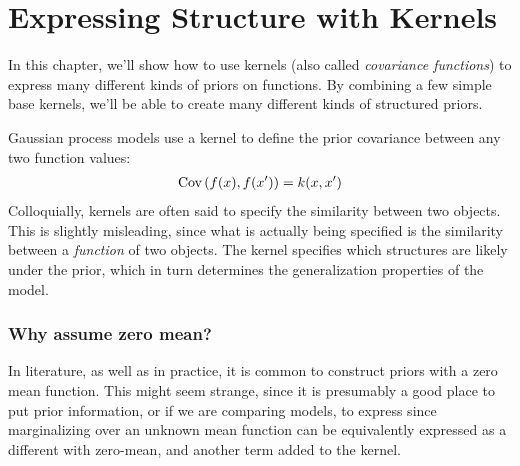 
\inbpdocument

\chapter{Expressing Structure with Kernels}
\label{ch:kernels}

In this chapter, we'll show how to use kernels (also called \emph{covariance functions}) to express many different kinds of priors on functions.
By combining a few simple base kernels, we'll be able to create many different kinds of structured priors.


Gaussian process models use a kernel to define the prior covariance between any two function values:
%
\begin{align}
\textrm{Cov}\left(f(x), f(x') \right) = k(x,x')
\end{align}
%
Colloquially, kernels are often said to specify the similarity between two objects.
This is slightly misleading, since what is actually being specified is the similarity between a \emph{function} of two objects.
The kernel specifies which structures are likely under the \gp{} prior, which in turn determines the generalization properties of the model.





\subsection{Why assume zero mean?}

In literature, as well as in practice, it is common to construct \gp{} priors with a zero mean function.
This might seem strange, since it is presumably a good place to put prior information, or if we are comparing models, to express  since marginalizing over an unknown mean function can be equivalently expressed as a different \gp{} with zero-mean, and another term added to the kernel.

